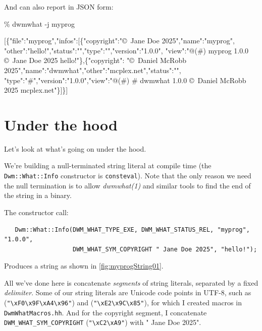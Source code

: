 \documentclass[letterpaper,openany]{book}
\begin{document}
And can also report in JSON form:

\begin{ttfamily}
\% dwmwhat -j myprog\\
\parbox{\linewidth}{[\{"file":"myprog","infos":[\{"copyright":"\copyright\ Jane Doe 2025","name":"myprog", "other":"hello!","status":"","type":"","version":"1.0.0", "view":"@(\#)   myprog 1.0.0 \copyright\ Jane Doe 2025 hello!"\},\{"copyright": "\copyright\ Daniel McRobb 2025","name":"dwmwhat","other":"mcplex.net","status":"", "type":"\#","version":"1.0.0","view":"@(\#) \#  dwmwhat 1.0.0 \copyright\ Daniel McRobb 2025 mcplex.net"\}]\}]}
\end{ttfamily}

\section{Under the hood}
Let's look at what's going on under the hood.

We're building a null-terminated string literal at compile time (the
\texttt{Dwm::What::Info} constructor is \texttt{consteval}).  Note that
the only reason we need the null termination is to allow {\em dwmwhat(1)}
and similar tools to find the end of the string in a binary.

The constructor call:

\begin{verbatim}
   Dwm::What::Info(DWM_WHAT_TYPE_EXE, DWM_WHAT_STATUS_REL, "myprog", "1.0.0",
                   DWM_WHAT_SYM_COPYRIGHT " Jane Doe 2025", "hello!");
\end{verbatim}

Produces a string as shown in \autoref{fig:myprogString01}.



All we've done here is concatenate {\em segments} of string literals,
separated by a fixed {\em delimiter}.  Some of our string literals are
Unicode code points in UTF-8, such as 
(\texttt{"\textbackslash{xF0}\textbackslash{x9F}\textbackslash{xA4}\textbackslash{x96}"})
and 
(\texttt{"\textbackslash{xE2}\textbackslash{x9C}\textbackslash{x85}"}),
for which I created macros in \texttt{DwmWhatMacros.hh}.  And for the
copyright segment, I concatenate \texttt{DWM\_WHAT\_SYM\_COPYRIGHT}
(\texttt{"\textbackslash{xC2}\textbackslash{xA9}"}) with " Jane Doe 2025".
\end{document}
